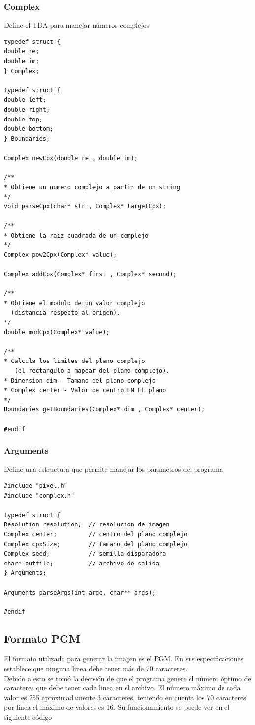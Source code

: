 \documentclass [12pt, a4paper]{article}
\begin{document}
	\vspace{5mm}
	\subsubsection{\textbf{Complex}}
		Define el TDA para manejar números complejos
	\begin{lstlisting}[frame=single]
typedef struct {
double re;
double im;
} Complex;

typedef struct {
double left;
double right;
double top;
double bottom;
} Boundaries;

Complex newCpx(double re , double im);

/** 
* Obtiene un numero complejo a partir de un string
*/
void parseCpx(char* str , Complex* targetCpx);

/**
* Obtiene la raiz cuadrada de un complejo
*/
Complex pow2Cpx(Complex* value);

Complex addCpx(Complex* first , Complex* second);

/** 
* Obtiene el modulo de un valor complejo 
  (distancia respecto al origen).
*/
double modCpx(Complex* value);

/** 
* Calcula los limites del plano complejo 
   (el rectangulo a mapear del plano complejo).
* Dimension dim - Tamano del plano complejo
* Complex center - Valor de centro EN EL plano
*/
Boundaries getBoundaries(Complex* dim , Complex* center);

#endif

	\end{lstlisting}
	
\subsubsection{\textbf{Arguments}}
Define una estructura que permite manejar los parámetros del programa
\begin{lstlisting}[frame=single]
#include "pixel.h"
#include "complex.h"

typedef struct {
Resolution resolution;  // resolucion de imagen
Complex center;         // centro del plano complejo
Complex cpxSize;        // tamano del plano complejo
Complex seed;           // semilla disparadora
char* outfile;          // archivo de salida
} Arguments;

Arguments parseArgs(int argc, char** args);

#endif

\end{lstlisting}
	
\subsection{Formato PGM}
	El formato utilizado para generar la imagen es el PGM. En sus especificaciones establece que ninguna linea debe tener más de 70 caracteres.\\Debido a esto se tomó la decisión de que el programa genere el número óptimo de caracteres que debe tener cada linea en el archivo. El número máximo de cada valor es 255 aproximadamente 3 caracteres, teniendo en cuenta los 70 caracteres por línea el máximo de valores es 16. Su funcionamiento se puede ver en el siguiente código 
	
\end{document}
